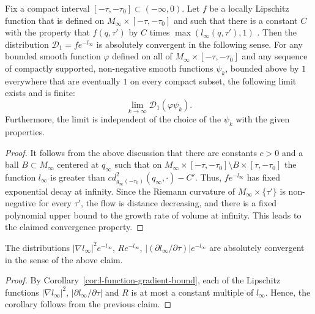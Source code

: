\begin{claim}\label{claim:absolute-convergence-weighted-distribution}
\label{absconv1}
 Fix a compact interval $[-\tau,-\tau_0]\subset
(-\infty,0)$. Let $f$ be a locally Lipschitz function that is
defined on $M_\infty\times [-\tau,-\tau_0]$ and such that there is a
constant $C$ with the property that $f(q,\tau')$ by $C$ times $\max(l_\infty(q,\tau'),1)$ . Then the distribution ${\mathcal
D}_1=fe^{-l_\infty}$ is absolutely convergent in the following
sense. For any bounded smooth function $\varphi$ defined on all of
$M_\infty\times [-\tau,-\tau_0]$ and any sequence of compactly
supported, non-negative smooth functions $\psi_k$, bounded above by
$1$ everywhere that are eventually $1$ on every compact subset, the
following limit exists and is finite:
$$\lim_{k\rightarrow\infty}{\mathcal D}_1(\varphi\psi_k).$$
 Furthermore, the limit is independent of the choice of the
$\psi_k$ with the given properties.
\end{claim}

\begin{proof}
It follows from the above discussion that there are constants $c>0$
 and a ball $B\subset M_\infty$ centered at $q_\infty$ such that on
$M_\infty\times [-\tau,-\tau_0]\setminus B\times [\tau,-\tau_0]$ the
function $l_\infty$ is greater than
$cd^2_{g_\infty(-\tau_0)}(q_\infty,\cdot)-C'$. Thus,
$fe^{-l_\infty}$ has fixed exponential decay at infinity. Since the
Riemann curvature of $M_\infty\times\{\tau'\}$ is non-negative for
every $\tau'$, the flow is distance decreasing, and there is a fixed
polynomial upper bound to the growth rate of volume at infinity.
This leads to the claimed convergence property.
\end{proof}


\begin{corollary}\label{cor:absolute-convergence-gradient-terms}
\label{absconv}
The distributions $|\nabla l_\infty|^2e^{-l_\infty}$,
$Re^{-l_\infty}$, $|(\partial l_\infty/\partial \tau)|e^{-l_\infty}$
are absolutely convergent in the sense of the above claim. \end{corollary}


\begin{proof}
 By
Corollary~\ref{cor:l-function-gradient-bound}, each of the Lipschitz functions $|\nabla
l_\infty|^2$, $|\partial l_\infty/\partial \tau|$ and $R$
  is at most a constant multiple of $l_\infty$.
Hence, the corollary follows from the previous claim.
\end{proof}




